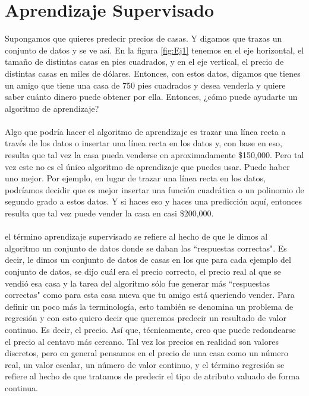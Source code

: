 \documentclass{book}
\begin{document}
\section{Aprendizaje Supervisado}
Supongamos que quieres
predecir precios de casas. Y digamos que trazas un conjunto de datos y se ve
así. En la figura \ref{fig:Ej1} tenemos en el eje horizontal, el tamaño de distintas casas en pies cuadrados,
y en el eje vertical, el precio de distintas casas en miles de dólares.
Entonces, con estos datos, digamos que tienes un amigo que tiene una casa de 750
pies cuadrados y desea venderla y quiere saber cuánto dinero puede
obtener por ella. Entonces, ¿cómo puede ayudarte un algoritmo de aprendizaje?\\\\ Algo que podría hacer
el algoritmo de aprendizaje es trazar una línea recta a través de los datos o insertar
una línea recta en los datos y, con base en eso, resulta que tal vez la casa pueda venderse
en aproximadamente \$150,000. Pero tal vez este no es el único algoritmo de aprendizaje que puedes
usar. Puede haber uno mejor. Por ejemplo, en lugar de trazar una línea
recta en los datos, podríamos decidir que es mejor insertar una función
cuadrática o un polinomio de segundo grado a estos datos. Y si haces eso y haces una
predicción aquí, entonces resulta que tal vez puede vender la casa en casi
\$200,000. \\\\
el término aprendizaje supervisado se refiere al hecho de que le dimos al algoritmo un conjunto de datos
donde se daban las ``respuestas correctas". Es decir, le dimos un conjunto de datos
de casas en los que para cada ejemplo del conjunto de datos, se dijo cuál era el
precio correcto, el precio real al que se vendió esa casa y la tarea del
algoritmo sólo fue generar más ``respuestas correctas" como para esta
casa nueva que tu amigo está queriendo vender. Para definir un poco más
la terminología, esto también se denomina un problema de regresión y con esto
quiero decir que queremos predecir un resultado de valor continuo. Es decir, el precio.
Así que, técnicamente, creo que puede redondearse el precio al centavo más cercano. Tal vez
los precios en realidad son valores discretos, pero en general pensamos en el precio de una casa
como un número real, un valor escalar, un número de valor continuo, y el término
regresión se refiere al hecho de que tratamos de predecir el tipo de atributo valuado
de forma continua.\\\\
\end{document}
